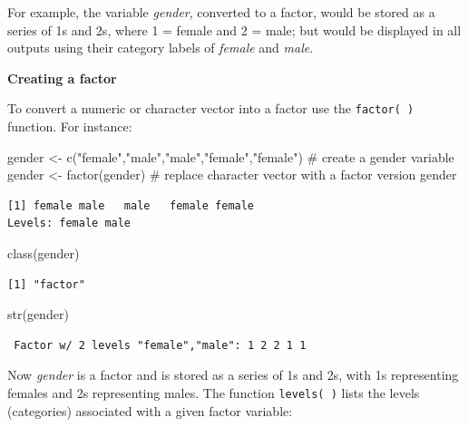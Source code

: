 \documentclass[
  letterpaper,
  DIV=11,
  numbers=noendperiod,
  oneside]{scrreprt}
\newenvironment{Shaded}{\begin{snugshade}}{\end{snugshade}}
\newcommand{\CommentTok}[1]{\textcolor[rgb]{0.37,0.37,0.37}{#1}}
\newcommand{\FunctionTok}[1]{\textcolor[rgb]{0.28,0.35,0.67}{#1}}
\newcommand{\NormalTok}[1]{\textcolor[rgb]{0.00,0.23,0.31}{#1}}
\newcommand{\OtherTok}[1]{\textcolor[rgb]{0.00,0.23,0.31}{#1}}
\newcommand{\StringTok}[1]{\textcolor[rgb]{0.13,0.47,0.30}{#1}}
\begin{document}
For example, the variable \emph{gender}, converted to a factor, would be
stored as a series of 1s and 2s, where 1 = female and 2 = male; but
would be displayed in all outputs using their category labels of
\emph{female} and \emph{male}.

\textbf{Creating a factor}

To convert a numeric or character vector into a factor use the
\texttt{factor(\ )} function. For instance:

\begin{Shaded}
\begin{Highlighting}[]
\NormalTok{gender }\OtherTok{\textless{}{-}} \FunctionTok{c}\NormalTok{(}\StringTok{"female"}\NormalTok{,}\StringTok{"male"}\NormalTok{,}\StringTok{"male"}\NormalTok{,}\StringTok{"female"}\NormalTok{,}\StringTok{"female"}\NormalTok{) }\CommentTok{\# create a gender variable}
\NormalTok{gender }\OtherTok{\textless{}{-}} \FunctionTok{factor}\NormalTok{(gender) }\CommentTok{\# replace character vector with a factor version}
\NormalTok{gender}
\end{Highlighting}
\end{Shaded}

\begin{verbatim}
[1] female male   male   female female
Levels: female male
\end{verbatim}

\begin{Shaded}
\begin{Highlighting}[]
\FunctionTok{class}\NormalTok{(gender)}
\end{Highlighting}
\end{Shaded}

\begin{verbatim}
[1] "factor"
\end{verbatim}

\begin{Shaded}
\begin{Highlighting}[]
\FunctionTok{str}\NormalTok{(gender)}
\end{Highlighting}
\end{Shaded}

\begin{verbatim}
 Factor w/ 2 levels "female","male": 1 2 2 1 1
\end{verbatim}

Now \emph{gender} is a factor and is stored as a series of 1s and 2s,
with 1s representing females and 2s representing males. The function
\texttt{levels(\ )} lists the levels (categories) associated with a
given factor variable:
\end{document}
